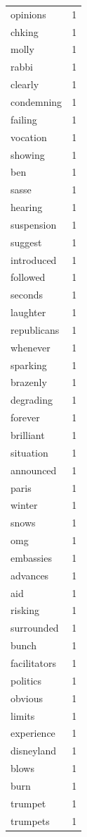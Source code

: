 \begin{tabular}{lr}
opinions & 1 \\
chking & 1 \\
molly & 1 \\
rabbi & 1 \\
clearly & 1 \\
condemning & 1 \\
failing & 1 \\
vocation & 1 \\
showing & 1 \\
ben & 1 \\
sasse & 1 \\
hearing & 1 \\
suspension & 1 \\
suggest & 1 \\
introduced & 1 \\
followed & 1 \\
seconds & 1 \\
laughter & 1 \\
republicans & 1 \\
whenever & 1 \\
sparking & 1 \\
brazenly & 1 \\
degrading & 1 \\
forever & 1 \\
brilliant & 1 \\
situation & 1 \\
announced & 1 \\
paris & 1 \\
winter & 1 \\
snows & 1 \\
omg & 1 \\
embassies & 1 \\
advances & 1 \\
aid & 1 \\
risking & 1 \\
surrounded & 1 \\
bunch & 1 \\
facilitators & 1 \\
politics & 1 \\
obvious & 1 \\
limits & 1 \\
experience & 1 \\
disneyland & 1 \\
blows & 1 \\
burn & 1 \\
trumpet & 1 \\
trumpets & 1 \\

\end{tabular}
